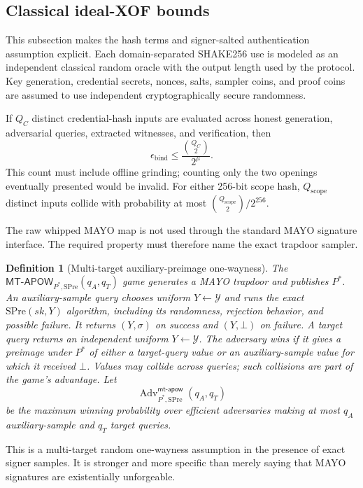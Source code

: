 \documentclass[11pt]{article}
\newcommand{\Adv}{\operatorname{Adv}}
\newtheorem{definition}{Definition}
\theoremstyle{remark}
\begin{document}
\subsection{Classical ideal-XOF bounds}

This subsection makes the hash terms and signer-salted authentication
assumption explicit. Each domain-separated SHAKE256 use is modeled as an
independent classical random oracle with the output length used by the
protocol. Key generation, credential secrets, nonces, salts, sampler coins,
and proof coins are assumed to use independent cryptographically secure
randomness.

If $Q_C$ distinct credential-hash inputs are evaluated across honest
generation, adversarial queries, extracted witnesses, and verification, then
\begin{equation}
\label{eq:binding-bound}
  \epsilon_{\mathrm{bind}}
  \leq \frac{\binom{Q_C}{2}}{2^\mu}.
\end{equation}
This count must include offline grinding; counting only the two openings
eventually presented would be invalid. For either 256-bit scope hash,
$Q_{\mathrm{scope}}$ distinct inputs collide with probability at most
$\binom{Q_{\mathrm{scope}}}{2}/2^{256}$.

The raw whipped MAYO map is not used through the standard MAYO signature
interface. The required property must therefore name the exact trapdoor
sampler.

\begin{definition}[Multi-target auxiliary-preimage one-wayness]
\label{def:mt-apow}
The $\mathsf{MT\text{-}APOW}_{P^*,\mathrm{SPre}}(q_A,q_T)$ game generates a
MAYO trapdoor and publishes $P^*$. An auxiliary-sample query chooses uniform
$Y\leftarrow\mathcal{Y}$ and runs the exact
$\mathrm{SPre}(sk,Y)$ algorithm, including its randomness, rejection
behavior, and possible failure. It returns $(Y,\sigma)$ on success and
$(Y,\bot)$ on failure. A target query returns an independent uniform
$Y\leftarrow\mathcal{Y}$. The adversary wins if it gives a preimage under
$P^*$ of either a target-query value or an auxiliary-sample value for which
it received $\bot$. Values may collide across queries; such collisions are
part of the game's advantage. Let
\[
 \Adv^{\mathsf{mt\text{-}apow}}_{P^*,\mathrm{SPre}}(q_A,q_T)
\]
be the maximum winning probability over efficient adversaries making at most
$q_A$ auxiliary-sample and $q_T$ target queries.
\end{definition}

This is a multi-target random one-wayness assumption in the presence of exact
signer samples. It is stronger and more specific than merely saying that
MAYO signatures are existentially unforgeable.
\end{document}
